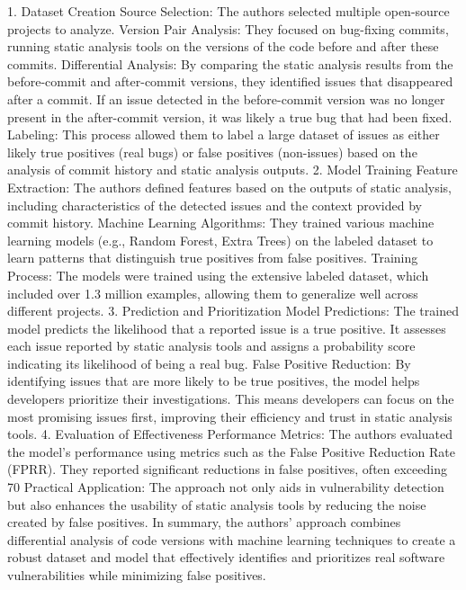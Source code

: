 1. Dataset Creation
Source Selection: The authors selected multiple open-source projects to analyze.
Version Pair Analysis: They focused on bug-fixing commits, running static analysis tools on the versions of the code before and after these commits.
Differential Analysis: By comparing the static analysis results from the before-commit and after-commit versions, they identified issues that disappeared after a commit. If an issue detected in the before-commit version was no longer present in the after-commit version, it was likely a true bug that had been fixed.
Labeling: This process allowed them to label a large dataset of issues as either likely true positives (real bugs) or false positives (non-issues) based on the analysis of commit history and static analysis outputs.
2. Model Training
Feature Extraction: The authors defined features based on the outputs of static analysis, including characteristics of the detected issues and the context provided by commit history.
Machine Learning Algorithms: They trained various machine learning models (e.g., Random Forest, Extra Trees) on the labeled dataset to learn patterns that distinguish true positives from false positives.
Training Process: The models were trained using the extensive labeled dataset, which included over 1.3 million examples, allowing them to generalize well across different projects.
3. Prediction and Prioritization
Model Predictions: The trained model predicts the likelihood that a reported issue is a true positive. It assesses each issue reported by static analysis tools and assigns a probability score indicating its likelihood of being a real bug.
False Positive Reduction: By identifying issues that are more likely to be true positives, the model helps developers prioritize their investigations. This means developers can focus on the most promising issues first, improving their efficiency and trust in static analysis tools.
4. Evaluation of Effectiveness
Performance Metrics: The authors evaluated the model's performance using metrics such as the False Positive Reduction Rate (FPRR). They reported significant reductions in false positives, often exceeding 70%
Practical Application: The approach not only aids in vulnerability detection but also enhances the usability of static analysis tools by reducing the noise created by false positives.
In summary, the authors' approach combines differential analysis of code versions with machine learning techniques to create a robust dataset and model that effectively identifies and prioritizes real software vulnerabilities while minimizing false positives.





